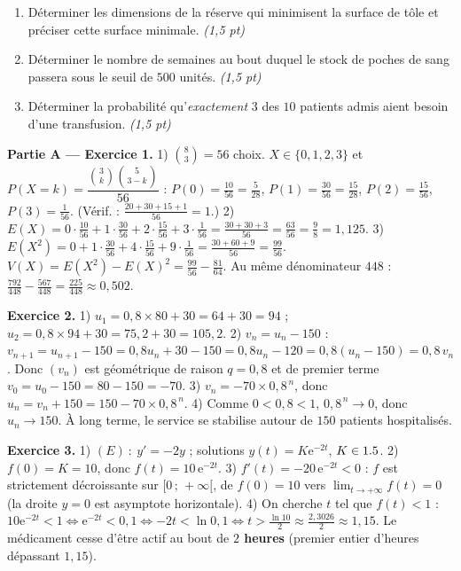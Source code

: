 \begin{enumerate}[label=\textbf{Tâche \arabic*.},leftmargin=2.4em]
\item Déterminer les dimensions de la réserve qui minimisent la surface de tôle et
préciser cette surface minimale. \hfill\textit{(1,5 pt)}
\item Déterminer le nombre de semaines au bout duquel le stock de poches de sang
passera sous le seuil de $500$ unités. \hfill\textit{(1,5 pt)}
\item Déterminer la probabilité qu'\emph{exactement} $3$ des $10$ patients admis
aient besoin d'une transfusion. \hfill\textit{(1,5 pt)}
\end{enumerate}
\par{}


\noindent\textbf{Partie A — Exercice 1.}
1) $\binom{8}{3}=56$ choix. $X\in\{0,1,2,3\}$ et
$P(X{=}k)=\dfrac{\binom3k\binom5{3-k}}{56}$ :
$P(0)=\frac{10}{56}=\frac5{28}$, $P(1)=\frac{30}{56}=\frac{15}{28}$,
$P(2)=\frac{15}{56}$, $P(3)=\frac{1}{56}$. (Vérif. : $\frac{20+30+15+1}{56}=1$.)
2) $E(X)=0\cdot\frac{10}{56}+1\cdot\frac{30}{56}+2\cdot\frac{15}{56}+3\cdot
\frac1{56}=\frac{30+30+3}{56}=\frac{63}{56}=\frac98=1{,}125$.
3) $E(X^2)=0+1\cdot\frac{30}{56}+4\cdot\frac{15}{56}+9\cdot\frac1{56}
=\frac{30+60+9}{56}=\frac{99}{56}$.
$V(X)=E(X^2)-E(X)^2=\frac{99}{56}-\frac{81}{64}$. Au même dénominateur $448$ :
$\frac{792}{448}-\frac{567}{448}=\frac{225}{448}\approx0{,}502$.

\noindent\textbf{Exercice 2.}
1) $u_1=0{,}8\times80+30=64+30=94$ ; $u_2=0{,}8\times94+30=75{,}2+30=105{,}2$.
2) $v_n=u_n-150$ : $v_{n+1}=u_{n+1}-150=0{,}8u_n+30-150=0{,}8u_n-120
=0{,}8(u_n-150)=0{,}8\,v_n$. Donc $(v_n)$ est géométrique de raison $q=0{,}8$ et de
premier terme $v_0=u_0-150=80-150=-70$.
3) $v_n=-70\times0{,}8^{\,n}$, donc $u_n=v_n+150=150-70\times0{,}8^{\,n}$.
4) Comme $0<0{,}8<1$, $0{,}8^{\,n}\to0$, donc $u_n\to150$. À long terme, le service
se stabilise autour de $150$ patients hospitalisés.

\noindent\textbf{Exercice 3.}
1) $(E)\ :\ y'=-2y$ ; solutions $y(t)=K\mathrm{e}^{-2t}$, $K\in1.5$.
2) $f(0)=K=10$, donc $f(t)=10\,\mathrm{e}^{-2t}$.
3) $f'(t)=-20\,\mathrm{e}^{-2t}<0$ : $f$ est strictement décroissante sur
$[0\,;\,+\infty[$, de $f(0)=10$ vers $\lim_{t\to+\infty}f(t)=0$ (la droite $y=0$
est asymptote horizontale).
4) On cherche $t$ tel que $f(t)<1$ : $10\mathrm{e}^{-2t}<1\Leftrightarrow
\mathrm{e}^{-2t}<0{,}1\Leftrightarrow-2t<\ln0{,}1\Leftrightarrow
t>\frac{\ln10}{2}\approx\frac{2{,}3026}{2}\approx1{,}15$. Le médicament cesse
d'être actif au bout de \textbf{$2$ heures} (premier entier d'heures dépassant
$1{,}15$).

